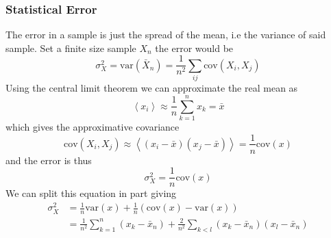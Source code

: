 \documentclass[a4paper, hidelinks, 10pt]{article}\usepackage[utf8]{inputenc}
\newcommand{\ecp}[1]{\left< {#1} \right>} %
\newcommand{\suml}[2]{\sum\limits_{#1=1}^{#2}}
\begin{document}
\subsubsection{Statistical Error}
\label{ssub:statistical_error}
    The error in a sample is just the spread of the mean, i.e the variance of
    said sample. Set a finite size sample $X_n$ the error would be
        \begin{equation}
            \sigma^2_X = \text{var}\left(\bar{X}_n\right) =
            \frac{1}{n^2}\sum\limits_{ij}\text{cov}\left(X_i,X_j\right)
            \label{eq:error}
        \end{equation}
    Using the central limit theorem we can approximate the real mean as
        \begin{equation}
            \ecp{x_i} \approx \frac{1}{n}\suml{k}{n} x_k  = \bar{x}
            \label{eq:meanapprox}
        \end{equation}
    which gives the approximative covariance
        \begin{equation}
            \text{cov}\left(X_i,X_j\right) \approx
            \ecp{(x_i-\bar{x})(x_j-\bar{x})} = \frac{1}{n}\text{cov}(x)
            \label{eq:covapprox}
        \end{equation}
    and the error is thus
        \begin{equation}
            \sigma^2_X = \frac{1}{n}\text{cov}(x)
            \label{eq:errorfinal}
        \end{equation}
    We can split this equation in part giving
        \begin{align}
            \sigma^2_X &= \frac{1}{n}\text{var}(x) +
            \frac{1}{n}\left(\text{cov}(x) - \text{var}(x)\right) \nonumber \\
            &= \frac{1}{n^2}\suml{k}{n} \left(x_k - \bar{x}_n\right) +
            \frac{2}{n^2}\sum\limits_{k<l}
            \left(x_k-\bar{x}_n\right)\left(x_l-\bar{x}_n\right)
            \label{eq:errorSplit}
        \end{align}
\end{document}
